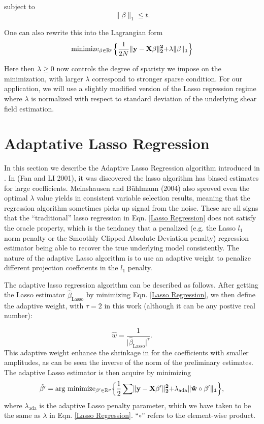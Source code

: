 subject to 
\[\lVert \beta \lVert_1\leq t.\] 

One can also rewrite this into the Lagrangian form
\begin{equation}
  \mathrm{minimize}_{\beta\in \mathbb{R}^p}\Bigl\{ \frac{1}{2N}\lVert \bf{y} - \bf{X}\beta \lVert^2_2 + \lambda \lVert\beta \lVert_1\Bigl\}
  \label{Lasso Regression}
\end{equation}

Here then $\lambda \geq 0$ now controls the degree of sparisty we impose on the minimization, with larger $\lambda$ correspond to stronger sparse condition. For our application, we will use a slightly modified version of the Lasso regression regime where $\lambda$ is 
normalized with respect to standard deviation of the underlying shear field estimation. 

\section{Adaptative Lasso Regression}
In this section we describe the Adaptive Lasso Regression algorithm introduced in \cite{AdaLASSO-Zou2006}. In (Fan and LI 2001), it was discovered the lasso algorithm has biased estimates for large coefficients. Meinshausen and Bühlmann (2004) also sproved even the optimal $\lambda$ value yields in consistent variable selection results, meaning that the regression algorithm sometimes picks up signal from the noise. These are all signs that the  ``traditional'' lasso regression in Eqn. \ref{Lasso Regression} does not satisfy the oracle property, which is the tendancy that a penalized (e.g. the Lasso $l_1$ norm penalty or the Smoothly Clipped Absolute Deviation penalty) regression estimator being able to recover the true underlying model consistently. The nature of the adaptive Lasso algorithm is to use an adaptive weight to penalize different projection coeffcients in the $l_1$ penalty. 

The adaptive lasso regression algorithm can be described as follows. After getting the Lasso estimator $\hat{\beta}_{\mathrm{Lasso}}$ by minimizing Eqn. \ref{Lasso Regression}, we then define the adaptive weight, with $\tau=2$ in this work (although it can be any postive real number):

\begin{equation}
  \hat{w} = \frac{1}{\lvert \hat{\beta}_{\mathrm{Lasso}} \rvert^\tau}.
  \label{weightFactor}
\end{equation}
This adaptive weight enhance the shrinkage in for the coefficients with smaller amplitudes, as can be seen the inverse of the norm of the preliminary estimates. 
The adaptive Lasso estimator is then acquire by minimizing 
\begin{equation}
  \hat{\beta'} =  \mathrm{arg}\text{ } \mathrm{minimize}_{\beta'\in \mathbb{R}^p}\Bigl\{ \frac{1}{2}\sum\lVert \bf{y} - \bf{X}\beta' \lVert^2_2 + \lambda_{\mathrm{ada}} \lVert\hat{w} \circ \beta' \lVert_1\Bigl\},
  \label{adaptiveLasso}
\end{equation}
where $\lambda_{\mathrm{ada}}$ is the adaptive Lasso penalty parameter, which we have taken to be the same as $\lambda$ in Eqn. \ref{Lasso Regression}. ``$\circ$'' refers to the element-wise product. 